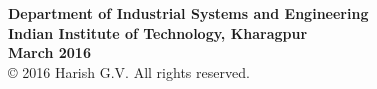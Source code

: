 \documentclass[12pt]{report}
\begin{document}
\begin{center}
\textbf{Department of Industrial Systems and Engineering}\\[-0.5em]
\textbf{Indian Institute of Technology, Kharagpur}\\[1em]
\textbf{March 2016}\\

\copyright{ 2016 Harish G.V. All rights reserved.}

\end{center}











%
%
%
%
\end{document}
